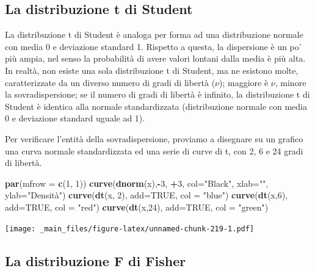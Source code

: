 \documentclass[a4paper,12pt,oneside]{book}
\newenvironment{Shaded}{\begin{snugshade}}{\end{snugshade}}
\newcommand{\KeywordTok}[1]{\textcolor[rgb]{0.13,0.29,0.53}{\textbf{#1}}}
\newcommand{\DataTypeTok}[1]{\textcolor[rgb]{0.13,0.29,0.53}{#1}}
\newcommand{\DecValTok}[1]{\textcolor[rgb]{0.00,0.00,0.81}{#1}}
\newcommand{\StringTok}[1]{\textcolor[rgb]{0.31,0.60,0.02}{#1}}
\newcommand{\OtherTok}[1]{\textcolor[rgb]{0.56,0.35,0.01}{#1}}
\newcommand{\OperatorTok}[1]{\textcolor[rgb]{0.81,0.36,0.00}{\textbf{#1}}}
\newcommand{\NormalTok}[1]{#1}
\theoremstyle{definition}
\theoremstyle{definition}
\theoremstyle{definition}
\theoremstyle{remark}
\begin{document}
\subsection{La distribuzione t di
Student}\label{la-distribuzione-t-di-student}

La distribuzione t di Student è analoga per forma ad una distribuzione
normale con media 0 e deviazione standard 1. Rispetto a questa, la
dispersione è un po' più ampia, nel senso la probabilità di avere valori
lontani dalla media è più alta. In realtà, non esiste una sola
distribuzione t di Student, ma ne esistono molte, caratterizzate da un
diverso numero di gradi di libertà (\(\nu\)); maggiore è \(\nu\), minore
la sovradispersione; se il numero di gradi di libertà è infinito, la
distribuzione t di Student è identica alla normale standardizzata
(distribuzione normale con media 0 e deviazione standard uguale ad 1).

Per verificare l'entità della sovradispersione, proviamo a disegnare su
un grafico una curva normale standardizzata ed una serie di curve di t,
con 2, 6 e 24 gradi di libertà.

\begin{Shaded}
\begin{Highlighting}[]
\KeywordTok{par}\NormalTok{(}\DataTypeTok{mfrow =} \KeywordTok{c}\NormalTok{(}\DecValTok{1}\NormalTok{, }\DecValTok{1}\NormalTok{))}
\KeywordTok{curve}\NormalTok{(}\KeywordTok{dnorm}\NormalTok{(x),}\OperatorTok{-}\DecValTok{3}\NormalTok{, }\OperatorTok{+}\DecValTok{3}\NormalTok{, }\DataTypeTok{col=}\StringTok{"Black"}\NormalTok{, }\DataTypeTok{xlab=}\StringTok{""}\NormalTok{,}
     \DataTypeTok{ylab=}\StringTok{"Densità"}\NormalTok{)}
\KeywordTok{curve}\NormalTok{(}\KeywordTok{dt}\NormalTok{(x, }\DecValTok{2}\NormalTok{), }\DataTypeTok{add=}\OtherTok{TRUE}\NormalTok{, }\DataTypeTok{col =} \StringTok{"blue"}\NormalTok{)}
\KeywordTok{curve}\NormalTok{(}\KeywordTok{dt}\NormalTok{(x,}\DecValTok{6}\NormalTok{), }\DataTypeTok{add=}\OtherTok{TRUE}\NormalTok{, }\DataTypeTok{col =} \StringTok{"red"}\NormalTok{)}
\KeywordTok{curve}\NormalTok{(}\KeywordTok{dt}\NormalTok{(x,}\DecValTok{24}\NormalTok{), }\DataTypeTok{add=}\OtherTok{TRUE}\NormalTok{, }\DataTypeTok{col =} \StringTok{"green"}\NormalTok{)}
\end{Highlighting}
\end{Shaded}

\texttt{[image: \_main\_files/figure-latex/unnamed-chunk-219-1.pdf]}

\subsection{La distribuzione F di
Fisher}\label{la-distribuzione-f-di-fisher}
\end{document}
